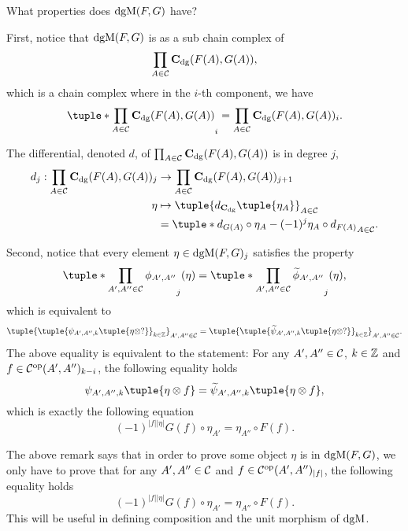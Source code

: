 \begin{remark}
    What properties does \( \operatorname{dgM}(F, G) \) have?

    First, notice that \( \operatorname{dgM}(F, G) \) is as a sub chain complex of
    \[
        \prod_{A \in {\mathcal{C}}} \operatorname{\mathbf{C}}_{\operatorname{dg}}(F(A), G(A)),
    \]
    which is a chain complex where in the \( i \)-th component, we have
    \[
        \tuple*{ \prod_{A \in \Cc} \C_{\dg}(F(A), G(A)) }_i = \prod_{A \in \Cc} \C_{\dg}(F(A), G(A))_i.
    \]

    The differential, denoted \( d \), of \( \prod_{A \in {\mathcal{C}}} \operatorname{\mathbf{C}}_{\operatorname{dg}}(F(A), G(A)) \) is in degree \( j \),
    \begin{align*}
        d_j: \prod_{A \in \Cc} \C_{\dg}(F(A), G(A))_j &\to \prod_{A \in \Cc} \C_{\dg}(F(A), G(A))_{j + 1} \\
        \eta &\mapsto \tuple{ d_{\C_{\dg}}\tuple{ \eta_A } }_{A \in \Cc} \\
        &= \tuple*{ d_{G(A)} \circ \eta_A - (-1)^j \eta_A \circ d_{F(A)} }_{A \in \Cc}.
    \end{align*}

    Second, notice that every element \( \eta \in \operatorname{dgM}(F, G)_j \) satisfies the property
    \[
        \tuple*{ \prod\limits_{A', A'' \in \Cc} \phi_{A', A''} }_j (\eta) = \tuple*{ \prod_{A', A'' \in \Cc} \widetilde{\phi}_{A', A''} }_j (\eta),
    \]
    which is equivalent to
    \[
        \tuple{ \tuple{ \psi_{A', A'', k}\tuple{ \eta \otimes ? } }_{k \in \Zb} }_{A', A'' \in \Cc} = \tuple{ \tuple{ \widetilde{\psi}_{A', A'', k}\tuple{ \eta \otimes ? } }_{k \in \Zb} }_{A', A'' \in \Cc}.
    \]
    The above equality is equivalent to the statement: For any \( A', A'' \in {\mathcal{C}} \), \( k \in {\mathbb{Z}} \) and \( f \in {\mathcal{C}}^{\operatorname{op}}(A', A'')_{k - i} \), the following equality holds
    \[
        \psi_{A', A'', k}\tuple{ \eta \otimes f } = \widetilde{\psi}_{A', A'', k} \tuple{ \eta \otimes f },
    \]
    which is exactly the following equation
    \[
        (-1)^{|f||\eta|}G(f) \circ \eta_{A'} = \eta_{A''} \circ F(f).
    \]
\end{remark}

The above remark says that in order to prove some object \( \eta \) is in \( \operatorname{dgM}(F, G) \), we only have to prove that for any \( A', A'' \in {\mathcal{C}} \) and \( f \in {\mathcal{C}}^{\operatorname{op}}(A', A'')_{|f|} \), the following equality holds
\[
        (-1)^{|f||\eta|}G(f) \circ \eta_{A'} = \eta_{A''} \circ F(f).
\]
This will be useful in defining composition and the unit morphism of \( \operatorname{dgM} \).

